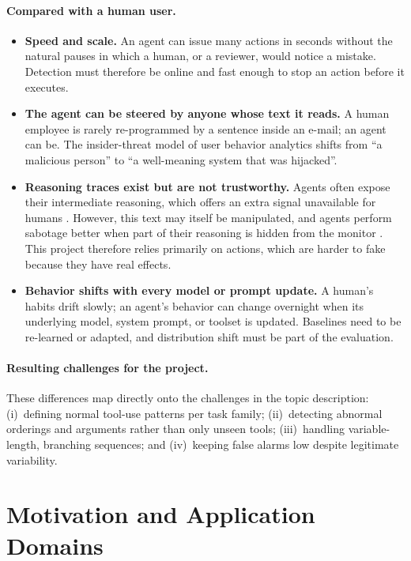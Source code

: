 \documentclass[11pt,a4paper]{article}
\begin{document}
\paragraph{Compared with a human user.}
\begin{itemize}
  \item \textbf{Speed and scale.} An agent can issue many actions in seconds without the natural pauses in which a human, or a reviewer, would notice a mistake. Detection must therefore be online and fast enough to stop an action before it executes.
  \item \textbf{The agent can be steered by anyone whose text it reads.} A human employee is rarely re-programmed by a sentence inside an e-mail; an agent can be. The insider-threat model of user behavior analytics shifts from ``a malicious person'' to ``a well-meaning system that was hijacked''.
  \item \textbf{Reasoning traces exist but are not trustworthy.} Agents often expose their intermediate reasoning, which offers an extra signal unavailable for humans \citep{chennabasappa2025llamafirewall}. However, this text may itself be manipulated, and agents perform sabotage better when part of their reasoning is hidden from the monitor \citep{kutasov2025shade}. This project therefore relies primarily on actions, which are harder to fake because they have real effects.
  \item \textbf{Behavior shifts with every model or prompt update.} A human's habits drift slowly; an agent's behavior can change overnight when its underlying model, system prompt, or toolset is updated. Baselines need to be re-learned or adapted, and distribution shift must be part of the evaluation.
\end{itemize}

\paragraph{Resulting challenges for the project.} These differences map directly onto the challenges in the topic description: (i)~defining normal tool-use patterns per task family; (ii)~detecting abnormal orderings and arguments rather than only unseen tools; (iii)~handling variable-length, branching sequences; and (iv)~keeping false alarms low despite legitimate variability.

\section{Motivation and Application Domains}
\label{sec:motivation}
\end{document}
